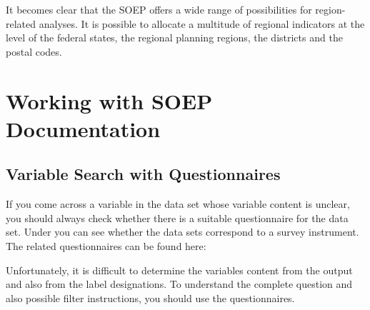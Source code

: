 \documentclass[letterpaper,10pt,openany,onesideH,english]{sphinxmanual}
\begin{document}
\begin{figure}[H]
\centering

\noindent{}
\end{figure}

It becomes clear that the SOEP offers a wide range of possibilities for region-related analyses. It is possible to allocate a multitude of regional indicators at the level of the federal states, the regional planning regions, the districts and the postal codes.


\chapter{Working with SOEP Documentation}
\label{\detokenize{Working with SOEP Documentation/index:working-with-soep-documentation}}\label{\detokenize{Working with SOEP Documentation/index::doc}}

\section{Variable Search with Questionnaires}
\label{\detokenize{Working with SOEP Documentation/index:variable-search-with-questionnaires}}\label{\detokenize{Working with SOEP Documentation/index:quest-search}}
If you come across a variable in the data set whose variable content is unclear, you should always check whether there is a suitable questionnaire for the data set. Under {\hyperref[\detokenize{Principles of Data Structure/index:overview}]{}} you can see whether the data sets correspond to a survey instrument. The related questionnaires can be found here:




\begin{figure}[H]
\centering

\noindent{}
\end{figure}

Unfortunately, it is difficult to determine the variables content from the output and also from the label designations. To understand the complete question and also possible filter instructions, you should use the questionnaires.

\end{document}
